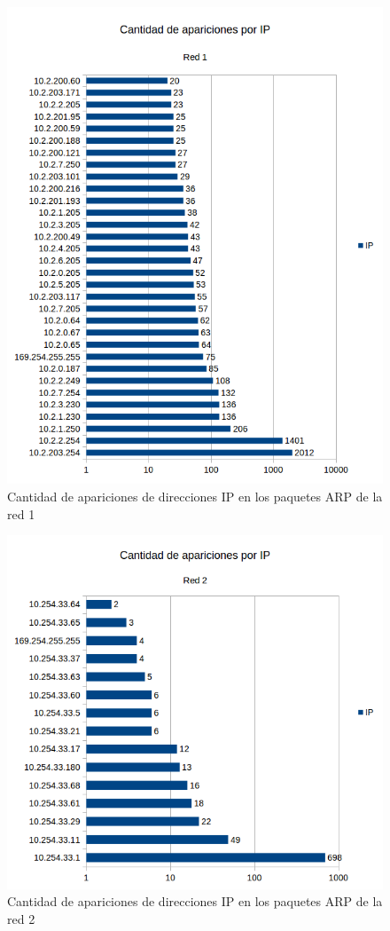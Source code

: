 \begin{figure}[H]
	\centering
	\includegraphics[scale=0.65]{imgs/red1_identificar.png}
	\caption{Cantidad de apariciones de direcciones IP en los paquetes ARP de la red 1}
      \label{red1_identificar}
\end{figure}

\begin{figure}[H]
	\centering
	\includegraphics[scale=0.65]{imgs/red2_identificar.png}
	\caption{Cantidad de apariciones de direcciones IP en los paquetes ARP de la red 2}
      \label{red2_identificar}
\end{figure}

